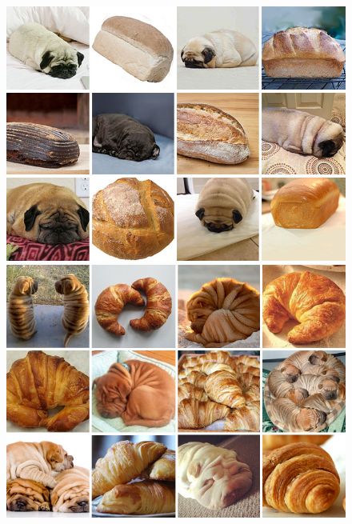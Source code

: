 \documentclass[a4paper, oneside]{discothesis}
\begin{document}
\begin{figure}[th]
	\begin{minipage}[t]{0.24\textwidth}\centering\includegraphics[width=\textwidth]{figures/dog-vs-loaf.jpeg}\end{minipage}
	\hfill
	\begin{minipage}[t]{0.24\textwidth}\centering\includegraphics[width=\textwidth]{figures/dog-vs-crossaint.jpeg}\end{minipage}
	\hfill

\end{figure}
\end{document}
